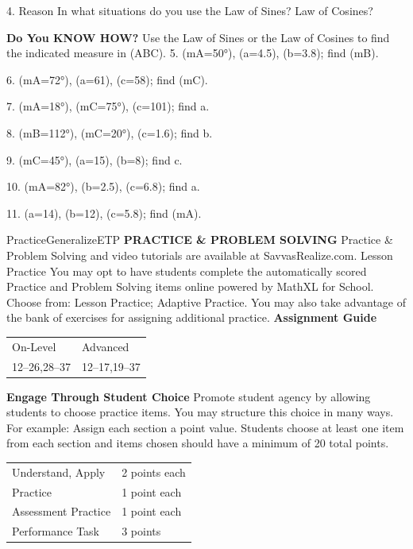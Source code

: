 \documentclass{article}
\newenvironment{concept-summary}{}{}    %
\newenvironment{te-addendum}[2]{}{}     %
\newcommand{\answer}[1]{}               %
\newcommand{\te}[1]{}                   %
\begin{document}
\begin{concept-summary}
\te{Printed ``negative square root of a''; likely negative square root when solving for a.}
4. Reason In what situations do you use the Law of Sines? Law of Cosines?
\answer{The Law of Sines is used to solve for a side or angle measure when you have a side and angle pair (a and A, for example), and one more side or angle. The Law of Cosines is used to find an angle when you have all three sides or to find a side when you have the other two sides and the included angle.}
\textbf{Do You KNOW HOW?}
Use the Law of Sines or the Law of Cosines to find the indicated measure in (\triangle ABC).
5. (m\angle A=50°), (a=4.5), (b=3.8); find (m\angle B).
\answer{about 40.3°}
6. (m\angle A=72°), (a=61), (c=58); find (m\angle C).
\answer{about 64.7°}
7. (m\angle A=18°), (m\angle C=75°), (c=101); find a.
\answer{about 32.3}
8. (m\angle B=112°), (m\angle C=20°), (c=1.6); find b.
\answer{about 4.3}
9. (m\angle C=45°), (a=15), (b=8); find c.
\answer{about 10.9}
10. (m\angle A=82°), (b=2.5), (c=6.8); find a.
\answer{about 6.9}
11. (a=14), (b=12), (c=5.8); find (m\angle A).
\answer{about 97.6°}
\end{concept-summary}
\begin{te-addendum}{Practice}{GeneralizeETP}
\textbf{PRACTICE \& PROBLEM SOLVING}
Practice \& Problem Solving and video tutorials are available at SavvasRealize.com.
Lesson Practice You may opt to have students complete the automatically scored Practice and Problem Solving items online powered by MathXL for School.
Choose from: Lesson Practice; Adaptive Practice.
You may also take advantage of the bank of exercises for assigning additional practice.
\textbf{Assignment Guide}
\begin{tabular}{ll}
On-Level & Advanced \\
12--26,28--37 & 12--17,19--37 \\
\end{tabular}
\textbf{Engage Through Student Choice}
Promote student agency by allowing students to choose practice items. You may structure this choice in many ways.
For example:
Assign each section a point value. Students choose at least one item from each section and items chosen should have a minimum of 20 total points.
\begin{tabular}{ll}
Understand, Apply & 2 points each \\
Practice & 1 point each \\
Assessment Practice & 1 point each \\
Performance Task & 3 points \\
\end{tabular}
\te{Scan the QR code to access a video tutorial.}
\end{te-addendum}
\end{document}
